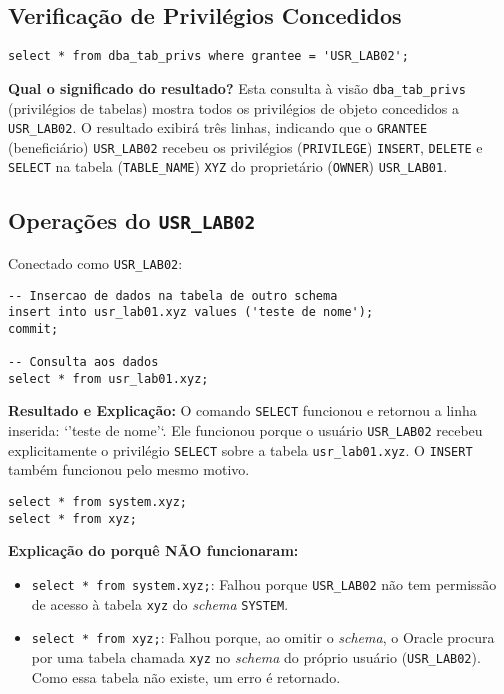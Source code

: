 \documentclass[a4paper, 12pt]{article}
\begin{document}
\subsection{Verificação de Privilégios Concedidos}
\begin{lstlisting}
select * from dba_tab_privs where grantee = 'USR_LAB02';
\end{lstlisting}
\textbf{Qual o significado do resultado?} Esta consulta à visão \texttt{dba\_tab\_privs} (privilégios de tabelas) mostra todos os privilégios de objeto concedidos a \texttt{USR\_LAB02}. O resultado exibirá três linhas, indicando que o \texttt{GRANTEE} (beneficiário) \texttt{USR\_LAB02} recebeu os privilégios (\texttt{PRIVILEGE}) \texttt{INSERT}, \texttt{DELETE} e \texttt{SELECT} na tabela (\texttt{TABLE\_NAME}) \texttt{XYZ} do proprietário (\texttt{OWNER}) \texttt{USR\_LAB01}.

\subsection{Operações do \texttt{USR\_LAB02}}
Conectado como \texttt{USR\_LAB02}:
\begin{lstlisting}
-- Insercao de dados na tabela de outro schema 
insert into usr_lab01.xyz values ('teste de nome');
commit;

-- Consulta aos dados
select * from usr_lab01.xyz;
\end{lstlisting}
\textbf{Resultado e Explicação:} O comando \texttt{SELECT} funcionou e retornou a linha inserida: `'teste de nome'`. Ele funcionou porque o usuário \texttt{USR\_LAB02} recebeu explicitamente o privilégio \texttt{SELECT} sobre a tabela \texttt{usr\_lab01.xyz}. O \texttt{INSERT} também funcionou pelo mesmo motivo.

\begin{lstlisting}
select * from system.xyz;
select * from xyz;
\end{lstlisting}
\textbf{Explicação do porquê NÃO funcionaram:}
\begin{itemize}
    \item \texttt{select * from system.xyz;}: Falhou porque \texttt{USR\_LAB02} não tem permissão de acesso à tabela \texttt{xyz} do \textit{schema} \texttt{SYSTEM}.
    \item \texttt{select * from xyz;}: Falhou porque, ao omitir o \textit{schema}, o Oracle procura por uma tabela chamada \texttt{xyz} no \textit{schema} do próprio usuário (\texttt{USR\_LAB02}). Como essa tabela não existe, um erro é retornado.
\end{itemize}
\end{document}

